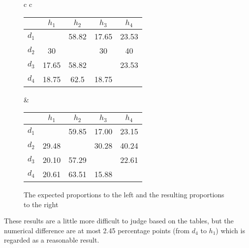 \begin{figure}

\begin{tabular} {c c }

\begin{tabular}{ | c | c c c c |}
	\hline
	 & $ h_1 $ & $ h_2 $ & $ h_3 $ & $ h_4 $\\
	\hline
	$ d_1 $ & $  $ & {\color{red}58.82} & {\color{red}17.65} & {\color{red}23.53}\\
	$ d_2 $ & {\color{blue}30} & $  $ & {\color{blue}30} & {\color{blue}40}\\
	$ d_3 $ & {\color{orange}17.65} & {\color{orange}58.82} & $  $ & {\color{orange}23.53}\\
	$ d_4 $ & {\color{purple}18.75} & {\color{purple}62.5} & {\color{purple}18.75} & $  $\\
	\hline
\end{tabular}

&

\begin{tabular}{ | c | c c c c |}
	\hline
	& $ h_1 $ & $ h_2 $ & $ h_3 $ & $ h_4 $\\
	\hline
	$ d_1 $ & $  $ & {\color{red}59.85} & {\color{red}17.00} & {\color{red}23.15}\\
	$ d_2 $ & {\color{blue}29.48} & $  $ & {\color{blue}30.28} & {\color{blue}40.24}\\
	$ d_3 $ & {\color{orange}20.10} & {\color{orange}57.29} & $  $ & {\color{orange}22.61} \\
	$ d_4 $ & {\color{purple}20.61} & {\color{purple}63.51} & {\color{purple}15.88} & $  $\\
	\hline
\end{tabular}
\end{tabular}
\caption{The expected proportions to the left and the resulting proportions to the right}\label{uneven_results}
\end{figure}

These results are a little more difficult to judge based on the tables, but the numerical difference are at most 2.45 percentage points (from $ d_4 $ to $ h_1 $) which is regarded as a reasonable result.